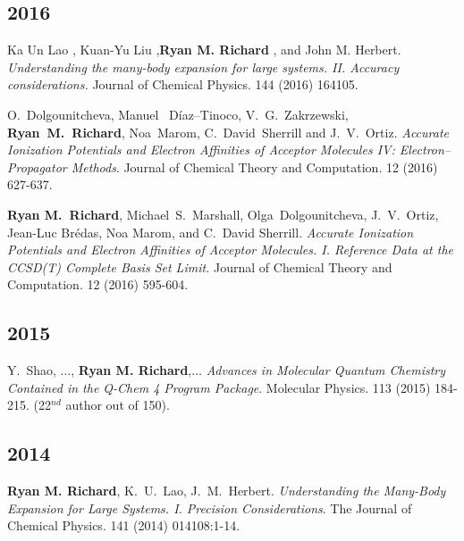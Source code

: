 \documentclass[11pt,a4paper,sans]{moderncv}
\begin{document}
\begin{etaremune}
	\subsection{2016}
	\item{Ka Un Lao , Kuan-Yu Liu ,\textbf{Ryan M. Richard} , and John M. 
		  Herbert. \emph{Understanding the many-body expansion for large 
		  systems. II. Accuracy considerations.}  Journal of Chemical Physics.  
		  144 (2016) 164105.}
	\item{O.~Dolgounitcheva, Manuel~ D{\'i}az–Tinoco, V.~G.~Zakrzewski, 
	      \textbf{Ryan~M.~Richard}, Noa~Marom, C.~David~Sherrill and 
		  J.~V.~Ortiz. \emph{Accurate Ionization Potentials and Electron 
		  Affinities of Acceptor Molecules {IV}: Electron–Propagator Methods}.  
		  Journal of Chemical Theory and Computation. 12 (2016) 627-637.}
	\item{\textbf{Ryan M.~Richard}, Michael~S.~Marshall, Olga~Dolgounitcheva, 
	      J.~V.~Ortiz, Jean-Luc Br{\' e}das, Noa Marom, and C.~David Sherrill.  
		  \emph{Accurate Ionization Potentials and Electron Affinities of 
		  Acceptor Molecules.  {I.} Reference Data at the CCSD(T) Complete Basis
		  Set Limit.}  Journal of Chemical Theory and Computation.  12 (2016) 
		  595-604.}

	\subsection{2015}
	\item{Y.~Shao, $\ldots$, \textbf{Ryan M. Richard},$\ldots$  {\em Advances 
	      in Molecular Quantum Chemistry Contained in the Q-Chem 4 Program 
		  Package}.  Molecular Physics.  113 (2015) 184-215. (22$^{nd}$ author 
		  out of 150).}

	\subsection{2014}
	\item{\textbf{Ryan M. Richard}, K.~U.~Lao, J.~M.~Herbert.  
	      {\em Understanding the Many-Body Expansion for Large Systems.  
		  I. Precision Considerations}.  The Journal of Chemical Physics.  
		  141 (2014) 014108:1-14.}


\end{etaremune}
\end{document}
